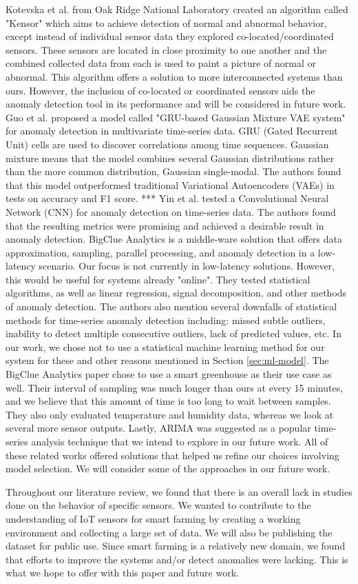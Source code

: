 Kotevska et al. \cite{kotevska2019kensor} from Oak Ridge National Laboratory created an algorithm called "Kensor" which aims to achieve detection of normal and abnormal behavior, except instead of individual sensor data they explored co-located/coordinated sensors. These sensors are located in close proximity to one another and the combined collected data from each is used to paint a picture of normal or abnormal. This algorithm offers a solution to more interconnected systems than ours.  However, the inclusion of co-located or coordinated sensors aids the anomaly detection tool in its performance and will be considered in future work. Guo et al. \cite{guo2018multidimensional} proposed a model called "GRU-based Gaussian Mixture VAE system" for anomaly detection in multivariate time-series data. GRU (Gated Recurrent Unit) cells are used to discover correlations among time sequences. Gaussian mixture means that the model combines several Gaussian distributions rather than the more common distribution, Gaussian single-modal. The authors found that this model outperformed traditional Variational Autoencoders (VAEs) in tests on accuracy and F1 score.  *** Yin et al. \cite{8986829} tested a Convolutional Neural Network (CNN) for anomaly detection on time-series data. The authors found that the resulting metrics were promising and achieved a desirable result in anomaly detection. BigClue Analytics \cite{hurubigclue} is a middle-ware solution that offers data approximation, sampling, parallel processing, and anomaly detection in a low-latency scenario. Our focus is not currently in low-latency solutions. However, this would be useful for systems already "online". They tested statistical algorithms, as well as linear regression, signal decomposition, and other methods of anomaly detection. The authors also mention several downfalls of statistical methods for time-series anomaly detection including: missed subtle outliers, inability to detect multiple consecutive outliers, lack of predicted values, etc. In our work, we chose not to use a statistical machine learning method for our system for these and other reasons mentioned in Section \ref{sec:ml-model}. The BigClue Analytics paper chose to use a smart greenhouse as their use case as well. Their interval of sampling was much longer than ours at every 15 minutes, and we believe that this amount of time is too long to wait between samples. They also only evaluated temperature and humidity data, whereas we look at several more sensor outputs. Lastly, ARIMA \cite{zhang2003time} was suggested as a popular time-series analysis technique that we intend to explore in our future work. All of these related works offered solutions that helped us refine our choices involving model selection. We will consider some of the approaches in our future work.

Throughout our literature review, we found that there is an overall lack in studies done on the behavior of specific sensors. We wanted to contribute to the understanding of IoT sensors for smart farming by creating a working environment and collecting a large set of data. We will also be publishing the dataset for public use. Since smart farming is a relatively new domain, we found that efforts to improve the systems and/or detect anomalies were lacking. This is what we hope to offer with this paper and future work.